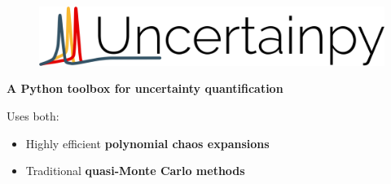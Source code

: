 \documentclass[presentation]{beamer}
\begin{document}
\begin{frame}[fragile]
\vspace{-2cm}
\begin{figure}
\includegraphics[width=1\textwidth]{uncertainpy.png}
\end{figure}



{\LARGE \bf A Python toolbox for uncertainty quantification}

\vspace{1.5cm}

Uses both:
\begin{itemize}
  \item Highly efficient \textbf{polynomial chaos expansions}
  \item Traditional \textbf{quasi-Monte Carlo methods}
\end{itemize}








\end{frame}




\end{document}
